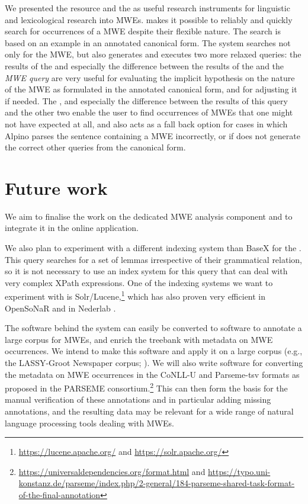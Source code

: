 \documentclass[output=paper,colorlinks,citecolor=brown]{langscibook}
\begin{document}
We presented the {\DUCAME} resource and the {\mwefinder} as useful research instruments for linguistic and lexicological research into MWEs. 
{\mwefinder} makes it possible to reliably and quickly search for occurrences of a MWE despite their flexible nature. The search is based on an example in an annotated canonical form. The system searches not only for the MWE, but also  generates and executes two more relaxed queries: the results of the \textit{\nearmissquery}  and especially the difference between the results of the \textit{\nearmissquery} and the \textit{MWE query} are very useful for evaluating the implicit hypothesis on the nature of the MWE as formulated in the annotated canonical form, and for adjusting it if needed. The \textit{{\supersetquery}}, and especially the difference between the results of this query and the other two enable the user to find occurrences of MWEs that one might not have expected at all, and also acts as a fall back option for cases in which Alpino parses the sentence containing a MWE incorrectly, or if {\mwefinder} does not generate the correct other queries from the canonical form.

\section{Future work}
\label{futurework}

We aim to finalise the work on the dedicated MWE analysis component and to integrate it in the online application.

We also plan to experiment with a different indexing system than BaseX for the {\supersetquery}. This query searches for a set of lemmas irrespective of their grammatical relation, so it is not necessary to use an index system for this query that can deal with very complex XPath expressions. One of the indexing systems we want to experiment with is Solr/Lucene,\footnote{\url{https://lucene.apache.org/} and \url{https://solr.apache.org/}} which has also proven very efficient in OpenSoNaR \citep{Does:etal:CLC20} and in Nederlab \citep{Brouwer:etal:MTAS:2016}.

The software behind the system can easily be converted to software to annotate a large corpus for MWEs, and enrich the treebank with metadata on MWE occurrences. We  intend to make this software and apply it on a large corpus (e.g., the LASSY-Groot Newspaper corpus; \cite{LASSY:2013}). We will also write software for converting the metadata on MWE occurrences in the CoNLL-U and Parseme-tsv formats as proposed in the PARSEME consortium.\footnote{\url{https://universaldependencies.org/format.html} and \url{https://typo.uni-konstanz.de/parseme/index.php/2-general/184-parseme-shared-task-format-of-the-final-annotation}} This can then form the basis for  the manual verification of these annotations and in particular adding missing annotations, and the resulting data may be relevant for a wide range of natural language processing tools dealing with MWEs.
\end{document}
